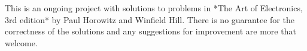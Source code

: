This is an ongoing project with solutions to problems in *The Art of Electronics, 3rd edition* by Paul Horowitz and Winfield Hill. There is no guarantee for the correctness of the solutions and any suggestions for improvement are more that welcome.